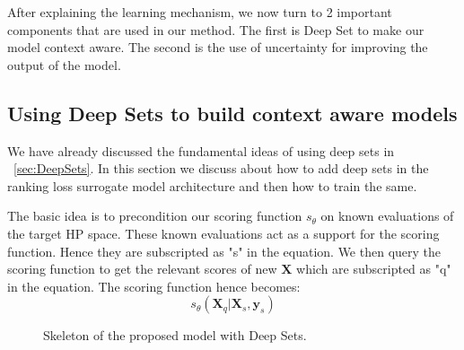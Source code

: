 \documentclass[12pt, twoside, ngerman]{report}
\begin{document}
After explaining the learning mechanism,  we now turn to 2 important components that are used in our method.
The first is Deep Set to make our model context aware.
The second is the use of uncertainty for improving the output of the model.

\subsection{Using Deep Sets to build context aware models}\label{sec:DeepSetWithModel}

We have already discussed the fundamental ideas of using deep sets in  ~\ref{sec:DeepSets}.
In this section we discuss about how to add deep sets in the ranking loss surrogate model architecture and then how to train the same.

The basic idea is to precondition our scoring function $s_{\theta}$ on known evaluations of the target HP space.
These known evaluations act as a support for the scoring function.
Hence they are subscripted as "s" in the equation.
We then query the scoring function to get the relevant scores of new $\textbf{X}$ which are subscripted as "q" in the equation.
The scoring function hence becomes:
$$
s_{\theta}(\textbf{X}_{q} | \textbf{X}_{s}, \textbf{y}_{s})
$$

\begin{figure}[htb]
\centering
{}
\caption{Skeleton of the proposed model with Deep Sets.}
\label{fig:proposeModelDeepSets}
\end{figure}
\end{document}

